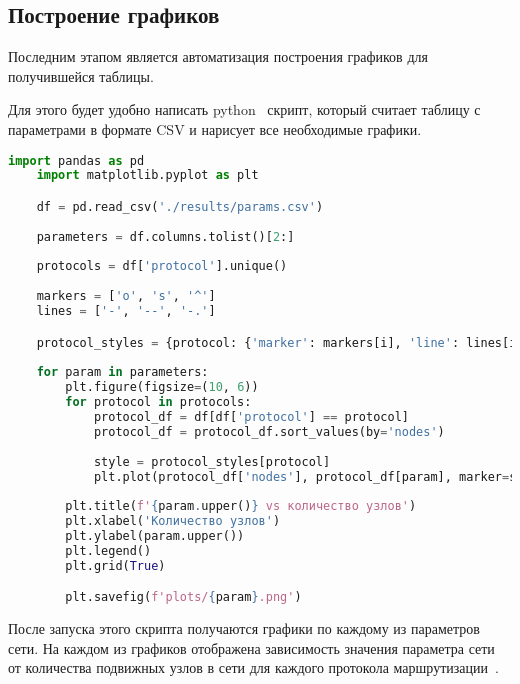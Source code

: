 \subsection*{Построение графиков}

Последним этапом является автоматизация построения графиков для получившейся таблицы.

Для этого будет удобно написать python~\cite{python} скрипт, который считает таблицу с параметрами в формате CSV и нарисует все необходимые графики.

\begin{lstlisting}[language=python, style=mystyle, caption=Python скрипт для построения графиков]
    import pandas as pd
    import matplotlib.pyplot as plt

    df = pd.read_csv('./results/params.csv')
    
    parameters = df.columns.tolist()[2:]
    
    protocols = df['protocol'].unique()
    
    markers = ['o', 's', '^']
    lines = ['-', '--', '-.']

    protocol_styles = {protocol: {'marker': markers[i], 'line': lines[i]} for i, protocol in enumerate(protocols)}
    
    for param in parameters:
        plt.figure(figsize=(10, 6))
        for protocol in protocols:
            protocol_df = df[df['protocol'] == protocol]
            protocol_df = protocol_df.sort_values(by='nodes')
    
            style = protocol_styles[protocol]
            plt.plot(protocol_df['nodes'], protocol_df[param], marker=style['marker'], linestyle=style['line'], label=protocol)
    
        plt.title(f'{param.upper()} vs количество узлов')
        plt.xlabel('Количество узлов')
        plt.ylabel(param.upper())
        plt.legend()
        plt.grid(True)

        plt.savefig(f'plots/{param}.png') 
\end{lstlisting}

После запуска этого скрипта получаются графики по каждому из параметров сети. На каждом из графиков отображена зависимость значения параметра сети от количества подвижных узлов в сети для каждого протокола маршрутизации~\cite{sarao2018comparison}.